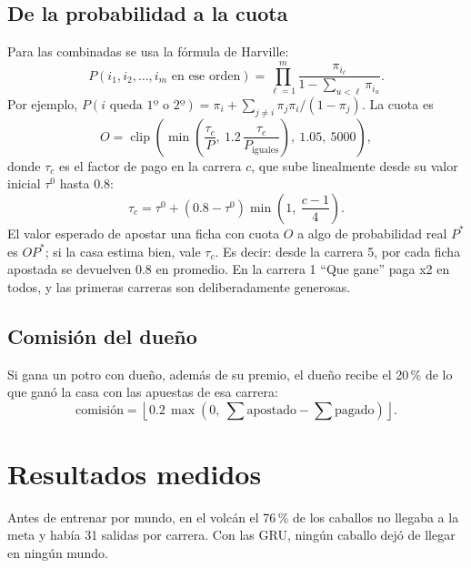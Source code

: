 \documentclass[11pt,letterpaper]{article}
\begin{document}
\subsection{De la probabilidad a la cuota}
Para las combinadas se usa la fórmula de Harville:
\begin{equation}
P(i_1, i_2, \dots, i_m \text{ en ese orden}) = \prod_{\ell=1}^{m} \frac{\pi_{i_\ell}}{1 - \sum_{u<\ell} \pi_{i_u}}.
\end{equation}
Por ejemplo, $P(i \text{ queda 1º o 2º}) = \pi_i + \sum_{j\ne i} \pi_j\pi_i/(1-\pi_j)$. La cuota es
\begin{equation}
O = \operatorname{clip}\!\left(\min\!\left(\frac{\tau_c}{P},\ 1.2\,\frac{\tau_c}{P_{\text{iguales}}}\right),\ 1.05,\ 5000\right),
\end{equation}
donde $\tau_c$ es el factor de pago en la carrera $c$, que sube linealmente desde su valor inicial $\tau^0$ hasta $0.8$:
\begin{equation}
\tau_c = \tau^0 + (0.8 - \tau^0)\min\!\left(1,\ \frac{c-1}{4}\right).
\end{equation}
El valor esperado de apostar una ficha con cuota $O$ a algo de probabilidad real $P^{*}$ es $O P^{*}$; si la casa estima bien, vale $\tau_c$. Es decir: desde la carrera 5, por cada ficha apostada se devuelven 0.8 en promedio. En la carrera 1 ``Que gane'' paga x2 en todos, y las primeras carreras son deliberadamente generosas.

\subsection{Comisión del dueño}
Si gana un potro con dueño, además de su premio, el dueño recibe el 20\,\% de lo que ganó la casa con las apuestas de esa carrera:
\begin{equation}
\text{comisión} = \left\lfloor 0.2\, \max\!\left(0,\ \textstyle\sum \text{apostado} - \sum \text{pagado}\right) \right\rfloor.
\end{equation}

\section{Resultados medidos}
Antes de entrenar por mundo, en el volcán el 76\,\% de los caballos no llegaba a la meta y había 31 salidas por carrera. Con las GRU, ningún caballo dejó de llegar en ningún mundo.
\end{document}
